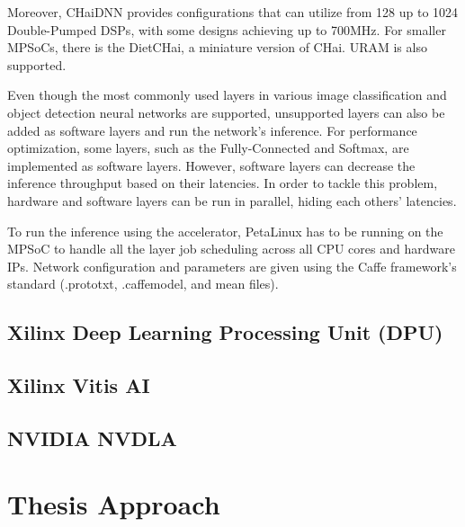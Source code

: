 Moreover, CHaiDNN provides configurations that can utilize from 128 up to 1024 Double-Pumped DSPs, with some designs achieving up to 700MHz. For smaller MPSoCs, there is the DietCHai, a miniature version of CHai. URAM is also supported.

Even though the most commonly used layers in various image classification and object detection neural networks are supported, unsupported layers can also be added as software layers and run the network's inference. For performance optimization, some layers, such as the Fully-Connected and Softmax, are implemented as software layers. However, software layers can decrease the inference throughput based on their latencies. In order to tackle this problem, hardware and software layers can be run in parallel, hiding each others' latencies.

To run the inference using the accelerator, PetaLinux has to be running on the MPSoC to handle all the layer job scheduling across all CPU cores and hardware IPs. Network configuration and parameters are given using the Caffe framework's standard (.prototxt, .caffemodel, and mean files).

\subsection{Xilinx Deep Learning Processing Unit (DPU)}
\subsection{Xilinx Vitis AI}
\subsection{NVIDIA NVDLA}

\section{Thesis Approach}
